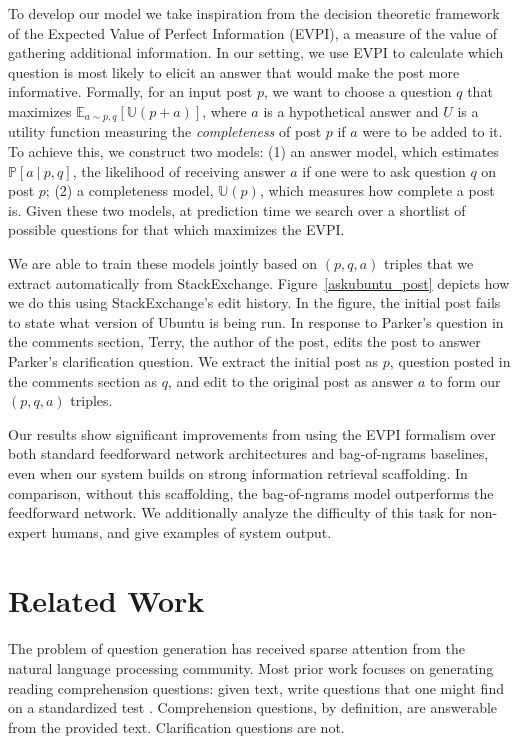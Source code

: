 \documentclass[11pt]{report}
\renewcommand\cite{\citep}	%
\newcommand{\U}{\mathbb{U}}
\begin{document}
To develop our model we take inspiration from the decision theoretic framework of the Expected Value of Perfect Information (EVPI), a measure of the value of gathering additional information. In our setting, we use EVPI to calculate which question is most likely to elicit an answer that would make the post more informative.
Formally, for an input post $p$, we want to choose a question $q$ that maximizes $\mathbb{E}_{a \sim p,q}[\U(p+a)]$, where $a$ is a hypothetical answer and $U$ is a utility function measuring the \emph{completeness} of post $p$ if $a$ were to be added to it.
To achieve this, we construct two models:
(1) an answer model, which estimates $\mathbb{P}[a~|~p,q]$, the likelihood of receiving answer $a$ if one were to ask question $q$ on post $p$;
(2) a completeness model, $\U(p)$, which measures how complete a post is.
Given these two models, at prediction time we search over a shortlist of possible questions for that which maximizes the EVPI.

We are able to train these models jointly based on $(p,q,a)$ triples that we extract automatically from StackExchange.
Figure~\ref{askubuntu_post} depicts how we do this using StackExchange's edit history.  In the figure, the initial post fails to state what version of Ubuntu is being run. In response to Parker's question in the comments section, Terry, the author of the post, edits the post to answer Parker's clarification question. We extract the initial post as $p$, question posted in the comments section as $q$, and edit to the original post as answer $a$ to form our $(p,q,a)$ triples. 

Our results show significant improvements from using the EVPI formalism over both standard feedforward network architectures and bag-of-ngrams baselines, even when our system builds on strong information retrieval scaffolding. In comparison, without this scaffolding, the bag-of-ngrams model outperforms the feedforward network. We additionally analyze the difficulty of this task for non-expert humans, and give examples of system output. 

\section{Related Work} \label{related_work}

The problem of question generation has received sparse attention from the natural language processing community. Most prior work focuses on generating reading comprehension questions:  given text, write questions that one might find on a standardized test \cite{vanderwende2008importance,heilman2011automatic,rus2011question,olney2012question}.  Comprehension questions, by definition, are answerable from the provided text. Clarification questions are not.  
\end{document}
